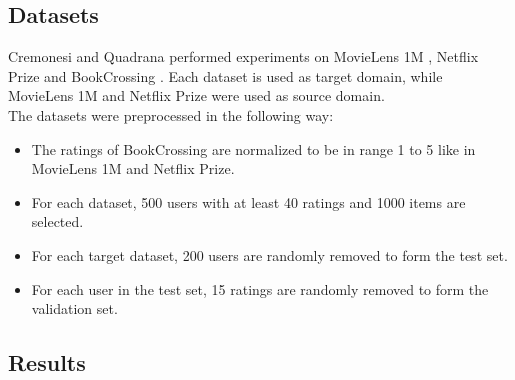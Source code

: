 \subsection{Datasets}

Cremonesi and Quadrana performed experiments on MovieLens 1M \cite{movielens-1m-dataset, 10.1145/1864708.1864721}, Netflix Prize \cite{netflix-prize-dataset, 10.1145/1864708.1864721} and BookCrossing \cite{10.1145/1060745.1060754}. Each dataset is used as target domain, while MovieLens 1M and Netflix Prize were used as source domain.\\
The datasets were preprocessed in the following way:
\begin{itemize}
\item The ratings of BookCrossing are normalized to be in range 1 to 5 like in MovieLens 1M and Netflix Prize.
\item For each dataset, 500 users with at least 40 ratings and 1000 items are selected.
\item For each target dataset, 200 users are randomly removed to form the test set.
\item For each user in the test set, 15 ratings are randomly removed to form the validation set.
\end{itemize}


\subsection{Results}

